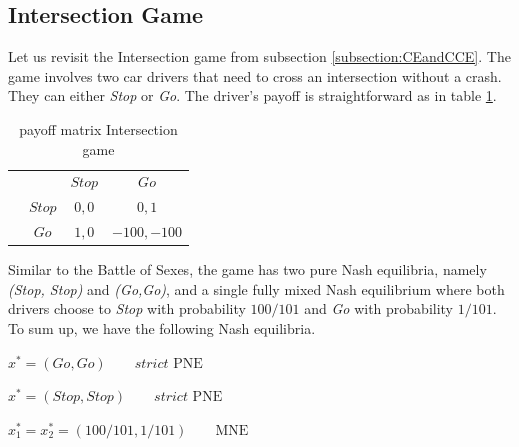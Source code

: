 \subsection{Intersection Game}\label{subsection:intersectionGame}

Let us revisit the Intersection game from subsection \ref{subsection:CEandCCE}. The game involves two car drivers that need to cross an intersection without a crash. They can either \textit{Stop} or \textit{Go}. The driver's payoff is straightforward as in table \ref{tab:payoffIntersection}. 

\begin{table}[H]\centering
\setlength{\extrarowheight}{2pt}
\begin{tabular}{cc|c|c|}
  & \multicolumn{1}{c}{} & \multicolumn{1}{c}{$Stop$}  & \multicolumn{1}{c}{$Go$} \\\cline{3-4}
  & $Stop$ & $0,0$ & $0,1$ \\\cline{3-4}
  & $Go$ & $1,0$ & $-100,-100$ \\\cline{3-4}
\end{tabular}\caption{\label{tab:payoffIntersection}payoff matrix Intersection game}
\end{table}

Similar to the Battle of Sexes, the game has two pure Nash equilibria, namely \textit{(Stop, Stop)} and \textit{(Go,Go)}, and a single fully mixed Nash equilibrium where both drivers choose to \textit{Stop} with probability $100/101$ and \textit{Go} with probability $1/101$. To sum up, we have the following Nash equilibria.

\begin{description}\centering
    \item $x^{*} = (Go,Go) \qquad \textit{strict }\text{PNE}$
    \item $x^{*} = (Stop,Stop) \qquad \textit{strict }\text{PNE}$
    \item $x_{1}^* = x_{2}^* = (100/101,1/101) \qquad \text{MNE}$
\end{description}

